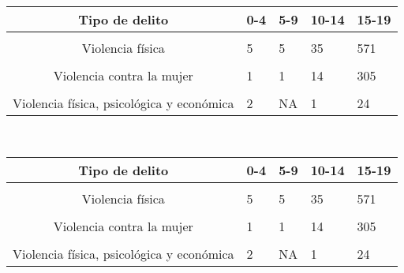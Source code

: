 \begin{tabular}[t]{cp{1cm}p{0.5cm}p{0.5cm}p{0.5cm}}
	\toprule
	\textbf{Tipo de delito} & \textbf{0-4} & \textbf{5-9} & \textbf{10-14} & \textbf{15-19}\\
	\midrule
	\cellcolor[HTML]{B6B3FF}{Violencia psicológica} & \cellcolor[HTML]{B6B3FF}{15} & \cellcolor[HTML]{B6B3FF}{5} & \cellcolor[HTML]{B6B3FF}{38} & \cellcolor[HTML]{B6B3FF}{770}\\
	Violencia física & 5 & 5 & 35 & 571 \\
	\cellcolor[HTML]{B6B3FF}{Violencia física y psicológica} & \cellcolor[HTML]{B6B3FF}{7} & \cellcolor[HTML]{B6B3FF}{NA} & \cellcolor[HTML]{B6B3FF}{28} & \cellcolor[HTML]{B6B3FF}{591}\\
	Violencia contra la mujer & 1 & 1 & 14 & 305 \\
	\cellcolor[HTML]{B6B3FF}{Violencia psicológica y económica} & \cellcolor[HTML]{B6B3FF}{NA} & \cellcolor[HTML]{B6B3FF}{NA} & \cellcolor[HTML]{B6B3FF}{NA} & \cellcolor[HTML]{B6B3FF}{24} \\
	Violencia física, psicológica y económica & 2 & NA & 1 & 24 \\
	\bottomrule
\end{tabular}
\\[1cm]
\begin{tabular}[t]{cp{1cm}p{0.5cm}p{0.5cm}p{0.5cm}}
	\toprule
	\textbf{Tipo de delito} & \textbf{0-4} & \textbf{5-9} & \textbf{10-14} & \textbf{15-19}\\
	\midrule
	\cellcolor[HTML]{B6B3FF}{Violencia psicológica} & \cellcolor[HTML]{B6B3FF}{15} & \cellcolor[HTML]{B6B3FF}{5} & \cellcolor[HTML]{B6B3FF}{38} & \cellcolor[HTML]{B6B3FF}{770}\\
	Violencia física & 5 & 5 & 35 & 571 \\
	\cellcolor[HTML]{B6B3FF}{Violencia física y psicológica} & \cellcolor[HTML]{B6B3FF}{7} & \cellcolor[HTML]{B6B3FF}{NA} & \cellcolor[HTML]{B6B3FF}{28} & \cellcolor[HTML]{B6B3FF}{591}\\
	Violencia contra la mujer & 1 & 1 & 14 & 305 \\
	\cellcolor[HTML]{B6B3FF}{Violencia psicológica y económica} & \cellcolor[HTML]{B6B3FF}{NA} & \cellcolor[HTML]{B6B3FF}{NA} & \cellcolor[HTML]{B6B3FF}{NA} & \cellcolor[HTML]{B6B3FF}{24} \\
	Violencia física, psicológica y económica & 2 & NA & 1 & 24 \\
	\bottomrule
\end{tabular}